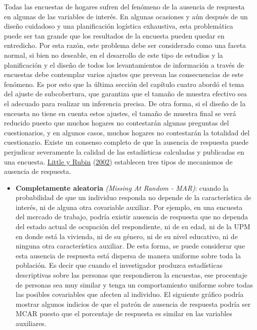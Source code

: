 \documentclass[
  12pt,
  spanish,
]{book}
\providecommand{\tightlist}{%
  \setlength{\itemsep}{0pt}\setlength{\parskip}{0pt}}
\begin{document}
Todas las encuestas de hogares sufren del fenómeno de la ausencia de respuesta en algunas de las variables de interés. En algunas ocasiones y aún después de un diseño cuidadoso y una planificación logística exhaustiva, esta problemática puede ser tan grande que los resultados de la encuesta pueden quedar en entredicho. Por esta razón, este problema debe ser considerado como una faceta normal, si bien no deseable, en el desarrollo de este tipo de estudios y la planificación y el diseño de todos los levantamientos de información a través de encuestas debe contemplar varios ajustes que prevean las consecuencias de este fenómeno. Es por esto que la última sección del capítulo cuatro abordó el tema del ajuste de subcobertura, que garantiza que el tamaño de muestra efectivo sea el adecuado para realizar un inferencia precisa. De otra forma, si el diseño de la enceusta no tiene en cuenta estos ajustes, el tamaño de muestra final se verá reducido puesto que muchos hogares no contestarán algunas preguntas del cuestionarios, y en algunos casos, muchos hogares no contestarán la totalidad del cuestionario. Existe un consenso completo de que la ausencia de respuesta puede perjudicar severamente la calidad de las estadísticas calculadas y publicadas en una encuesta. \protect\hyperlink{ref-Little_Rubin_2002}{Little y Rubin} (\protect\hyperlink{ref-Little_Rubin_2002}{2002}) establecen tres tipos de mecanismos de ausencia de respuesta.

\begin{itemize}
\tightlist
\item
  \textbf{Completamente aleatoria} \emph{(Missing At Random - MAR)}: cuando la probabilidad de que un individuo responda no depende de la característica de interés, ni de alguna otra covariable auxiliar. Por ejemplo, en una encuesta del mercado de trabajo, podría existir ausencia de respuesta que no dependa del estado actual de ocupación del respondiente, ni de su edad, ni de la UPM en donde está la vivienda, ni de su género, ni de su nivel educativo, ni de ninguna otra característica auxiliar. De esta forma, se puede considerar que esta ausencia de respuesta está dispersa de manera uniforme sobre toda la población. Es decir que cuando el investigador produzca estadísticas descriptivas sobre las personas que respondieron la encuestas, ese procentaje de personas sea muy similar y tenga un comportamiento uniforme sobre todas las posibles covariables que afecten al individuo. El siguiente gráfico podría mostrar algunos indicios de que el patrón de ausencia de respuesta podría ser MCAR puesto que el porcentaje de respuesta es similar en las variables auxiliares.
\end{itemize}
\end{document}
